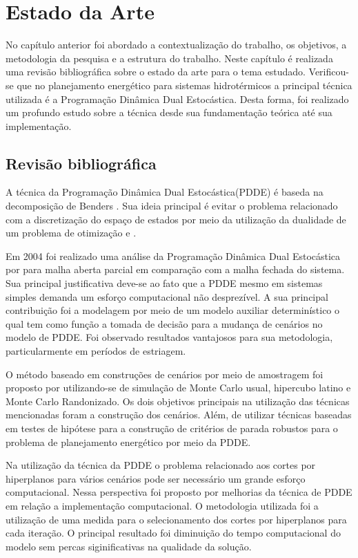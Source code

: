 \chapter{Estado da Arte}
No cap\'itulo anterior foi abordado a contextualiza\c c\~ao do trabalho, os objetivos, a metodologia da pesquisa e a
estrutura do trabalho. Neste cap\'itulo \'e realizada uma revis\~ao bibliogr\'afica sobre o estado da arte para o tema
estudado.
Verificou-se que no planejamento energ\'etico para sistemas hidrot\'ermicos a principal t\'ecnica utilizada \'e a
Programa\c c\~ao Din\^amica Dual Estoc\'astica. Desta forma, foi realizado um profundo estudo sobre a t\'ecnica desde sua
fundamenta\c c\~ao te\'orica at\'e sua implementa\c c\~ao.
\section{Revis\~ao bibliogr\'afica}
A t\'ecnica da Programa\c c\~ao Din\^amica Dual Estoc\'astica(PDDE) \'e baseda na decomposi\c c\~ao de Benders \cite{benders}.
Sua ideia principal \'e evitar o problema relacionado com a discretiza\c c\~ao do espa\c co de estados por meio da utiliza\c c\~ao da
dualidade de um problema de otimiza\c c\~ao \cite{alexey} e \cite{boyd}.

Em 2004 foi realizado uma an\'alise da Programa\c c\~ao  Din\^amica Dual Estoc\'astica por \cite{soares} para malha
aberta parcial em compara\c c\~ao com a malha fechada do sistema. Sua principal justificativa deve-se ao fato que a PDDE
mesmo em sistemas simples demanda um esfor\c co computacional n\~ao desprez\'ivel. A sua principal contribui\c c\~ao
foi a
modelagem por meio de um modelo auxiliar determin\'istico o qual tem como fun\c c\~ao a tomada de decis\~ao para a
mudan\c ca de cen\'arios no modelo de PDDE. Foi observado resultados vantajosos para sua metodologia, particularmente em
per\'iodos de estriagem.

O m\'etodo baseado em constru\c c\~oes de cen\'arios por meio de amostragem foi proposto por \cite{homem} utilizando-se
de simula\c c\~ao de Monte Carlo usual, hipercubo latino e Monte Carlo Randonizado. Os dois objetivos principais na
utiliza\c c\~ao das t\'ecnicas mencionadas foram a constru\c c\~ao dos cen\'arios. Al\'em, de utilizar t\'ecnicas
baseadas em testes de hip\'otese para a constru\c c\~ao de crit\'erios de parada robustos para o problema de
planejamento energ\'etico por meio da PDDE. 

Na utiliza\c c\~ao da t\'ecnica da PDDE o problema relacionado aos cortes por hiperplanos para v\'arios cen\'arios
pode ser necess\'ario um grande esfor\c co computacional. Nessa perspectiva foi proposto por \cite{dematos} melhorias da
t\'ecnica de PDDE em rela\c c\~ao a implementa\c c\~ao computacional. O metodologia utilizada foi a
utiliza\c c\~ao de uma medida para o selecionamento dos cortes por hiperplanos para cada itera\c c\~ao. O principal
resultado foi diminui\c c\~ao do tempo computacional do modelo sem percas siginificativas na qualidade da solu\c c\~ao. 

